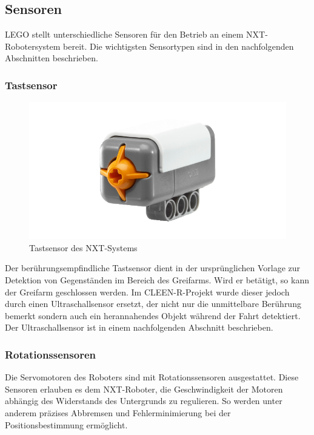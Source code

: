 \subsection{Sensoren}

LEGO stellt unterschiedliche Sensoren für den Betrieb an einem NXT-Robotersystem bereit. Die wichtigsten Sensortypen sind in den nachfolgenden Abschnitten beschrieben.

\subsubsection{Tastsensor}

\begin{figure}[h]
\centering
\includegraphics[width=\textwidth/3]{Bilder/Robot/button_sensor}
\caption{Tastsensor des NXT-Systems}
\label{fig:buttonSensor}
\end{figure}

Der berührungsempfindliche Tastsensor dient in der ursprünglichen Vorlage zur Detektion von Gegenständen im Bereich des Greifarms. Wird er betätigt, so kann der Greifarm geschlossen werden. Im CLEEN-R-Projekt wurde dieser jedoch durch einen Ultraschallsensor ersetzt, der nicht nur die unmittelbare Berührung bemerkt sondern auch ein herannahendes Objekt während der Fahrt detektiert. Der Ultraschallsensor ist in einem nachfolgenden Abschnitt beschrieben.

\subsubsection{Rotationssensoren}

Die Servomotoren des Roboters sind mit Rotationssensoren ausgestattet. Diese Sensoren erlauben es dem NXT-Roboter, die Geschwindigkeit der Motoren abhängig des Widerstands des Untergrunds zu regulieren. So werden unter anderem präzises Abbremsen und Fehlerminimierung bei der Positionsbestimmung ermöglicht.

